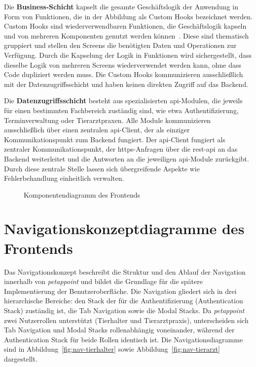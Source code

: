Die \textbf{Business-Schicht} kapselt die gesamte Geschäftslogik der Anwendung in Form von Funktionen, die in der Abbildung als Custom Hooks bezeichnet werden. Custom Hooks sind wiederverwendbaren Funktionen, die Geschäftslogik kapseln und von mehreren Komponenten genutzt werden können~\cite{custom-hooks}. Diese sind thematisch gruppiert und stellen den Screens die benötigten Daten und Operationen zur Verfügung. Durch die Kapselung der Logik in Funktionen wird sichergestellt, dass dieselbe Logik von mehreren Screens wiederverwendet werden kann, ohne dass Code dupliziert werden muss. Die Custom Hooks kommunizieren ausschließlich mit der Datenzugriffsschicht und haben keinen direkten Zugriff auf das Backend.

Die \textbf{Datenzugriffsschicht} besteht aus spezialisierten \gls{api}-Modulen, die jeweils für einen bestimmten Fachbereich zuständig sind, wie etwa Authentifizierung, Terminverwaltung oder Tierarztpraxen. Alle Module kommunizieren ausschließlich über einen zentralen \gls{api}-Client, der als einziger Kommunikationspunkt zum Backend fungiert. Der \gls{api}-Client fungiert als zentraler Kommunikationspunkt, der \gls{https}-Anfragen über die \gls{rest}-\gls{api} an das Backend weiterleitet und 
die Antworten an die jeweiligen \gls{api}-Module zurückgibt. Durch diese zentrale Stelle lassen sich übergreifende Aspekte wie Fehlerbehandlung einheitlich verwalten.

\clearpage
\begin{figure}[H]
    \centering
    
    \caption{Komponentendiagramm des Frontends}
    \label{fig:komponentendiagramm}
\end{figure}

\section{Navigationskonzeptdiagramme des Frontends}

Das Navigationskonzept beschreibt die Struktur und den Ablauf der Navigation innerhalb von \textit{petappoint} und bildet die Grundlage für die spätere Implementierung der Benutzeroberfläche. Die Navigation gliedert sich in drei hierarchische Bereiche: den Stack der für die Authentifizierung (Authentication Stack) zuständig ist, die Tab Navigation sowie die Modal Stacks. Da \textit{petappoint} zwei Nutzerrollen unterstützt (Tierhalter und Tierarztpraxis), unterscheiden sich Tab Navigation und Modal Stacks rollenabhängig voneinander, während der Authentication Stack für beide Rollen identisch ist. Die Navigationsdiagramme sind in Abbildung~\ref{fig:nav-tierhalter} sowie Abbildung~\ref{fig:nav-tierarzt} dargestellt.

